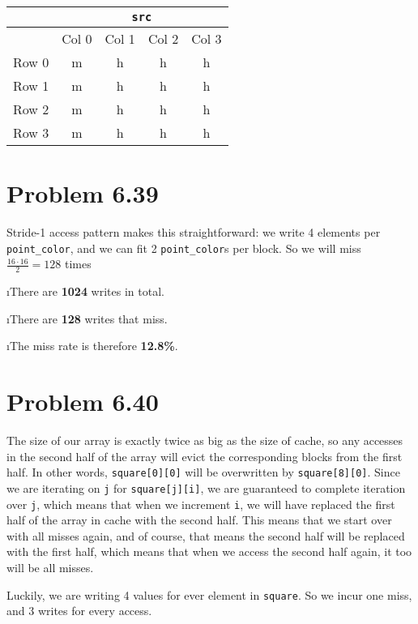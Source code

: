 \documentclass[fleqn]{article}
\begin{document}
\begin{tabular}{ c|c|c|c|c| }
  & \multicolumn{4}{|c|}{\texttt{src}} \\
  \hline
  & Col 0 & Col 1 & Col 2 & Col 3 \\
  \hline
  Row 0 & m & h & h & h \\
  \hline
  Row 1 & m & h & h & h \\
  \hline
  Row 2 & m & h & h & h \\
  \hline
  Row 3 & m & h & h & h \\
  \hline
\end{tabular}

\ene

\section{Problem 6.39}

Stride-1 access pattern makes this straightforward: we write 4 elements per \texttt{point\_color}, and we can fit 2 \texttt{point\_color}s per block. So we will miss $\frac{16 \cdot 16}{2} = 128$ times

\bee

\i There are \textbf{1024} writes in total.

\i There are \textbf{128} writes that miss.

\i The miss rate is therefore \textbf{12.8\%}.

\ene

\section{Problem 6.40}

The size of our array is exactly twice as big as the size of cache, so any accesses in the second half of the array will evict the corresponding blocks from the first half. In other words, \texttt{square[0][0]} will be overwritten by \texttt{square[8][0]}. Since we are iterating on \texttt{j} for \texttt{square[j][i]}, we are guaranteed to complete iteration over \texttt{j}, which means that when we increment \texttt{i}, we will have replaced the first half of the array in cache with the second half. This means that we start over with all misses again, and of course, that means the second half will be replaced with the first  half, which means that when we access the second half again, it too will be all misses.

Luckily, we are writing 4 values for ever element in \texttt{square}. So we incur one miss, and 3 writes for every access. 
\end{document}
